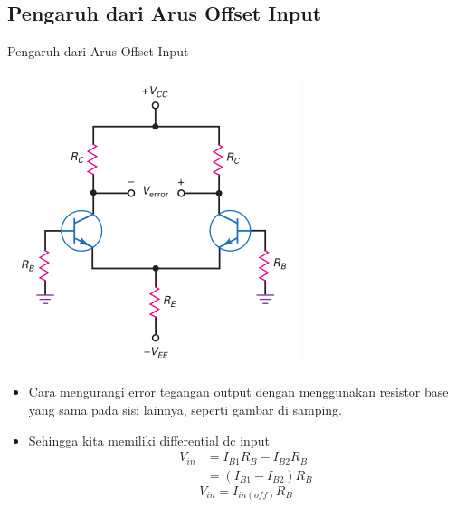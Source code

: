 \documentclass[aspectratio=169]{beamer}
\begin{document}
\subsection{Pengaruh dari Arus Offset Input}
\begin{frame}{Pengaruh dari Arus Offset Input}
	\begin{multicols}{2}
		\begin{center}
			\includegraphics[height=0.7\textheight]{gambar/01.diff-amp/01.equal_base_resistance_on_other_side_reduces_error}
		\end{center}
		\columnbreak
		\begin{itemize}
			\item Cara mengurangi error tegangan output dengan menggunakan resistor base yang sama pada sisi lainnya, seperti gambar di samping.
			\item Sehingga kita memiliki differential dc input
			\begin{align*}
				V_{in} &= I_{B1}R_B - I_{B2}R_B \\
				&= (I_{B1} - I_{B2})R_B				
			\end{align*}
			\begin{equation}
				V_{in} = I_{in(off)}R_B
			\end{equation}
		\end{itemize}
	\end{multicols}
\end{frame}
\end{document}
